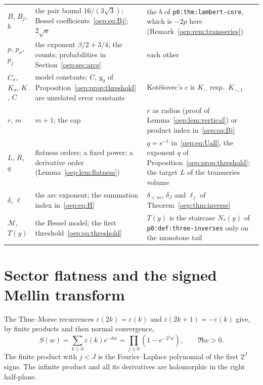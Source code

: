 \documentclass[11pt,letterpaper]{article}
\theoremstyle{remark}\newtheorem{remark}[theorem]{Remark}
\newcommand{\eps}{\varepsilon}
\newcommand{\calM}{\mathcal M}
\newcommand{\file}[1]{\nolinkurl{#1}}
\begin{document}
\begin{minipage}{\textwidth}
\begin{tabular}{@{}>{\raggedright\arraybackslash}p{0.95in}>{\raggedright\arraybackslash}p{3.1in}>{\raggedright\arraybackslash}p{2.05in}@{}}
$B$, $B_j$, $b$ & the pair bound $16/(3\sqrt3)$; Bessel coefficients~\eqref{oep:eq:Bj}; $2\sqrt a$ & the $b$ of \file{p0:thm:lambert-core}, which is $-2p$ here (Remark~\ref{oep:rem:transseries})\\
$p$, $p_\sigma$, $p_j$ & the exponent $\beta/2+3/4$; the counts; probabilities in Section~\ref{oep:sec:arcs} & each other\\
$C_\sigma$, $K_\sigma$, $K$, $C$ & model constants; $C$, $y_0$ of Proposition~\ref{oep:prop:threshold} are unrelated error constants & Kot\v e\v sovec's $c$ is $K_-$ resp.\ $K_{-,1}$\\
$r$, $m$ & $m+1$; the cap & $r$ as radius (proof of Lemma~\ref{oep:lem:vertical}) or product index in~\eqref{oep:eq:Bj}\\
$L$, $R$, $q$ & flatness orders; a fixed power; a derivative order (Lemma~\ref{oep:lem:flatness}) & $q=e^{-t}$ in~\eqref{oep:eq:Uall}, the exponent $q$ of Proposition~\ref{oep:prop:threshold}; the target $L$ of the transseries volume\\
$\delta$, $\ell$ & the arc exponent; the summation index in~\eqref{oep:eq:H} & $\delta_{<m}$, $\delta_J$ and $\ell_j$ of Theorem~\ref{oep:thm:inverse}\\
$\calM$, $T(y)$ & the Bessel model; the first threshold~\eqref{oep:eq:threshold} & $T(y)$ is the staircase $N_\ast(y)$ of \file{p0:def:three-inverses} only on the monotone tail\\
\bottomrule
\end{tabular}
\endgroup
\end{minipage}

\section{Sector flatness and the signed Mellin transform}\label{oep:sec:mellin}
The Thue--Morse recurrences $\eps(2k)=\eps(k)$ and $\eps(2k+1)=-\eps(k)$ give, by finite products and then normal convergence,
\begin{equation}\label{oep:eq:S}
 S(w)=\sum_{k\geq0}\eps(k)e^{-kw}
     =\prod_{j\geq0}(1-e^{-2^jw}),\qquad \Re w>0.
\end{equation}
The finite product with $j<J$ is the Fourier--Laplace polynomial of the first $2^J$ signs. The infinite product and all its derivatives are holomorphic in the right half-plane.
\end{document}
